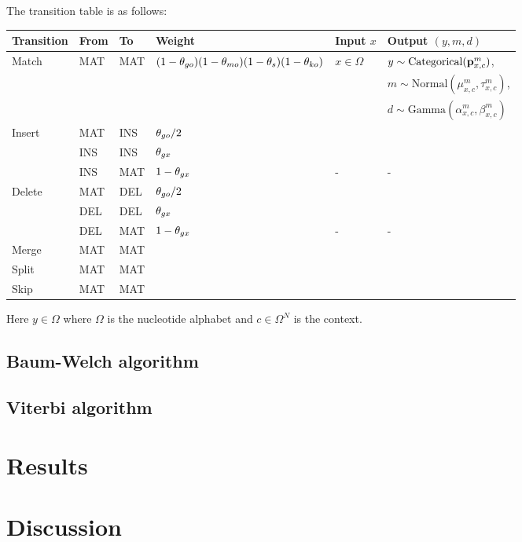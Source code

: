 \documentclass[10pt]{article}
\begin{document}
The transition table is as follows:

\begin{tabular}{llllll}
Transition & From & To & Weight & Input $x$ & Output $(y,m,d)$
\\
\hline
Match & MAT & MAT & $(1-\theta_{go})(1-\theta_{mo})(1-\theta_s)(1-\theta_{ko})$ & $x \in \Omega$ &
$y \sim \mbox{Categorical}({\bf p}^m_{x,c})$,
\\ & & & & &
$m \sim \mbox{Normal}(\mu^m_{x,c},\tau^m_{x,c})$,
\\ & & & & &
$d \sim \mbox{Gamma}(\alpha^m_{x,c},\beta^m_{x,c})$
\\
Insert & MAT & INS & $\theta_{go}/2$ \\
       & INS & INS & $\theta_{gx}$ \\
       & INS & MAT & $1 - \theta_{gx}$ & - & - \\
Delete & MAT & DEL & $\theta_{go}/2$ \\
       & DEL & DEL & $\theta_{gx}$ \\
       & DEL & MAT & $1 - \theta_{gx}$ & - & - \\
Merge & MAT & MAT \\
Split & MAT & MAT \\
Skip & MAT & MAT \\
\end{tabular}

Here $y \in \Omega$ where $\Omega$ is the nucleotide alphabet
and $c \in \Omega^N$ is the context.



\subsection{Baum-Welch algorithm}

\subsection{Viterbi algorithm}



\newpage
\section{Results}




\section{Discussion}
\end{document}

